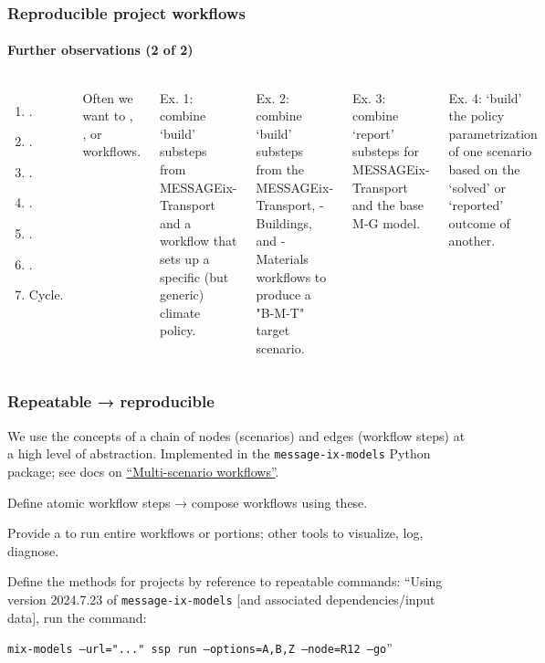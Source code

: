 \documentclass[12pt,aspectratio=169]{beamer}
\begin{document}
\begin{frame}
\frametitle{Reproducible project workflows}
\framesubtitle{Further observations (2 of 2)}

\begin{columns}[T]
\begin{enumerate}
  \item {}.
  \item {}.
  \item {}.
  \item {}.
  \item {}.
  \item {}.
  \item Cycle.
\end{enumerate}

Often we want to , , or  workflows.

\smallskip
Ex. 1: combine ‘build’ substeps from MESSAGEix-Transport and a workflow that sets up a specific (but generic) climate policy.

\smallskip
Ex. 2: combine ‘build’ substeps from the MESSAGEix-Transport, -Buildings, and -Materials workflows to produce a "B-M-T" target scenario.

\smallskip
Ex. 3: combine ‘report’ substeps for MESSAGEix-Transport and the base M-G model.

\smallskip
Ex. 4: ‘build’ the policy parametrization of one scenario based on the ‘solved’ or ‘reported’ outcome of another.
\end{columns}
\end{frame}

\begin{frame}
\frametitle{Repeatable → reproducible}

We use the concepts of a chain of nodes (scenarios) and edges (workflow steps) at a high level of abstraction.
Implemented in the \texttt{message-ix-models} Python package; see docs on \href{https://docs.messageix.org/projects/models/en/latest/api/workflow.html}{“Multi-scenario workflows”}.

\bigskip
Define atomic workflow steps → compose workflows using these.

\bigskip
Provide a  to run entire workflows or portions; other tools to visualize, log, diagnose.

\bigskip
Define the methods for projects by reference to repeatable commands: “Using version 2024.7.23 of \texttt{message-ix-models} [and associated dependencies/input data], run the command:

\texttt{mix-models --url="..." ssp run --options=A,B,Z --node=R12 --go}”
\end{frame}
\end{document}
